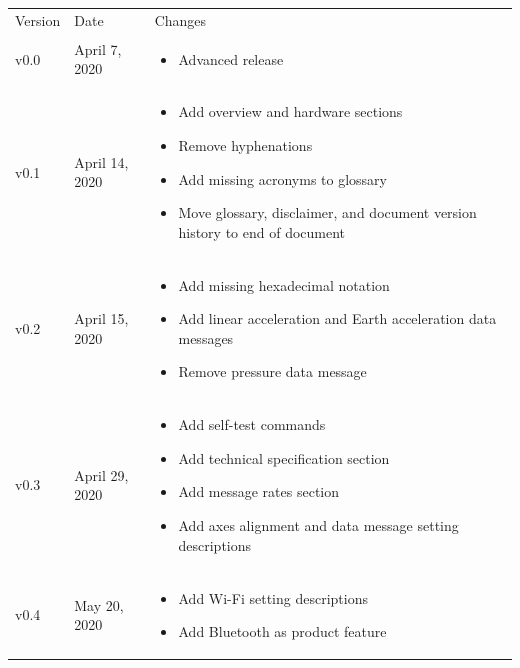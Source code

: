 
\def\arraystretch{1.5}
\begin{longtable}{| >{\centering}p{} | p{} | >{\raggedright\arraybackslash}p{} |}
    \arrayrulecolor{gray!50}\hline
    Version & Date & Changes\\
    \arrayrulecolor{gray!50}\hline
    v0.0 & April 7, 2020 &
    \begin{itemize}
        \item Advanced release
    \end{itemize}\\
    v0.1 & April 14, 2020 &
    \begin{itemize}
        \item Add overview and hardware sections
        \item Remove hyphenations
        \item Add missing acronyms to glossary
        \item Move glossary, disclaimer, and document version history to end of document
    \end{itemize}\\
    v0.2 & April 15, 2020 &
    \begin{itemize}
        \item Add missing hexadecimal notation
        \item Add linear acceleration and Earth acceleration data messages
        \item Remove pressure data message
    \end{itemize}\\
    v0.3 & April 29, 2020 &
    \begin{itemize}
        \item Add self-test commands
        \item Add technical specification section
        \item Add message rates section
        \item Add axes alignment and data message setting descriptions
    \end{itemize}\\
    v0.4 & May 20, 2020 &
    \begin{itemize}
        \item Add Wi-Fi setting descriptions
        \item Add Bluetooth as product feature
    \end{itemize}\\

\end{longtable}

